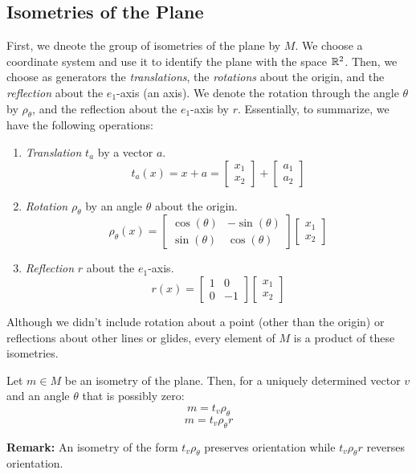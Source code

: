 \documentclass[letterpaper]{article}
\begin{document}
\subsection{Isometries of the Plane}
First, we dneote the group of isometries of the plane by $M$. We choose a coordinate system and use it to identify the plane with the space $\mathbb{R}^2$. Then, we choose as generators the \emph{translations}, the \emph{rotations} about the origin, and the \emph{reflection} about the $e_1$-axis (an axis). We denote the rotation through the angle $\theta$ by $\rho_{\theta}$, and the reflection about the $e_1$-axis by $r$. Essentially, to summarize, we have the following operations:
\begin{enumerate}
    \item \emph{Translation} $t_a$ by a vector $a$. 
    \[t_{a}(x) = x + a = \begin{bmatrix}
        x_1 \\ x_2
    \end{bmatrix} + \begin{bmatrix}
        a_1 \\ a_2
    \end{bmatrix}\]
    \item \emph{Rotation} $\rho_{\theta}$ by an angle $\theta$ about the origin. 
    \[\rho_{\theta}(x) = \begin{bmatrix}
        \cos(\theta) & -\sin(\theta) \\ 
        \sin(\theta) & \cos(\theta)
    \end{bmatrix} \begin{bmatrix}
        x_1 \\ x_2
    \end{bmatrix}\] 
    \item \emph{Reflection} $r$ about the $e_1$-axis.
    \[r(x) = \begin{bmatrix}
        1 & 0 \\ 0 & -1
    \end{bmatrix} \begin{bmatrix}
        x_1 \\ x_2 
    \end{bmatrix}\]
\end{enumerate}
Although we didn't include rotation about a point (other than the origin) or reflections about other lines or glides, every element of $M$ is a product of these isometries. 

\begin{theorem}{}{}
    Let $m \in M$ be an isometry of the plane. Then, for a uniquely determined vector $v$ and an angle $\theta$ that is possibly zero: 
    \[m = t_v \rho_{\theta}\]
    \[m = t_v \rho_{\theta} r\] 
\end{theorem}
\textbf{Remark:} An isometry of the form $t_v \rho_{\theta}$ preserves orientation while $t_v \rho_{\theta} r$ reverses orientation. 
\end{document}
